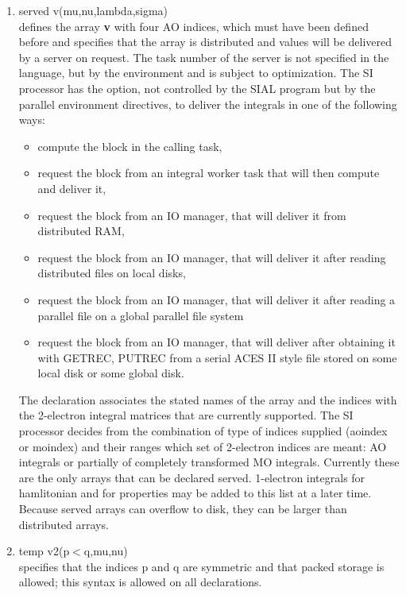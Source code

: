\documentclass[12pt]{article}
\begin{document}
\begin{enumerate}
\item served v(mu,nu,lambda,sigma)\\
defines the array {\bf v} with four AO indices, which must have been defined before and 
specifies that the array is distributed and values will be delivered by a server on 
request. The task number of the server is not specified in the language, but by the 
environment and is subject to optimization. The SI processor has the option, not 
controlled by the SIAL program but by the parallel environment directives, to deliver 
the integrals in one of the following ways:\\ 
\begin{itemize} 
\item compute the block in the calling task,\\ 
\item request the block from an integral worker task that will then compute and deliver it,\\ 
\item request the block from an IO manager, that will deliver it from distributed RAM,\\ 
\item request the block from an IO manager, that will deliver it after reading distributed 
files on local disks,\\ 
\item request the block from an IO manager, that will deliver it after reading a parallel 
file on a global parallel file system\\ 
\item request the block from an IO manager, that will deliver after obtaining it with 
GETREC, PUTREC from a serial ACES II style file stored on some local disk or some 
global disk.\\ 
 \end{itemize} 
The declaration associates the stated names of the array and the indices with the 
2-electron integral matrices that are currently supported. The SI processor decides from 
the combination of type of indices supplied (aoindex or moindex) and their
ranges which set of 2-electron indices are meant: AO integrals or partially of completely 
transformed MO integrals. Currently these are the only arrays that can be declared served. 
1-electron integrals for hamlitonian and for properties may be added to this list at a 
later time. Because served arrays can overflow to disk, they can be larger than 
distributed arrays.

\item temp v2(p$<$q,mu,nu)\\ 
specifies that the indices p and q are symmetric and that packed storage is allowed; this 
syntax is allowed on all declarations.

\end{enumerate} 
\end{document}
